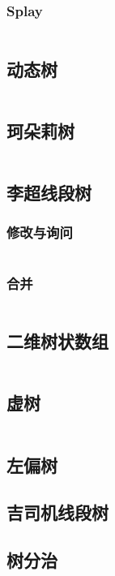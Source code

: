 \documentclass[10pt, a4paper, oneside]{ctexart}
\begin{document}
\begin{multicols}{2}
        \subsubsection{Splay}
        \inputminted{cpp}{src/data structure/splay.cpp}
        \subsection{动态树}
        \inputminted{cpp}{src/data structure/LCT.cpp}
        \subsection{珂朵莉树}
        \inputminted{cpp}{src/data structure/ODT.cpp}
        \subsection{李超线段树}
        \subsubsection{修改与询问}
        \inputminted{cpp}{src/data structure/lichao.cpp}
        \subsubsection{合并}
        \inputminted{cpp}{src/data structure/lichao-merge.cpp}
        \subsection{二维树状数组}
        \inputminted{cpp}{src/data structure/2D-BIT.cpp}
        \subsection{虚树}
        \inputminted{cpp}{src/data structure/virtual-tree.cpp}
        \subsection{左偏树}
        
        \subsection{吉司机线段树}
        
        \subsection{树分治}
        


\end{multicols}
\end{document}
